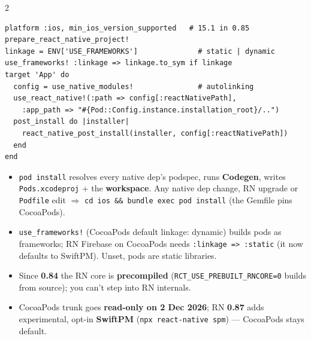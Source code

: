 \documentclass[8pt]{extarticle}
\newcommand\ct[1]{\texttt{#1}}
\newcommand\dd{\hbox{-}\hbox{-}}          %
\newcommand\fat{\hbox{=}\hbox{>}}         %
\newcommand\hd[1]{\par\vspace{3pt}\noindent{\bfseries\color{sheetBlue}#1}\par\vspace{1pt}}
\begin{document}

\begin{multicols}{2}
\raggedright{}

\hd{Podfile and \ct{pod install}}
\begin{lstlisting}[language=RubySheet]
platform :ios, min_ios_version_supported   # 15.1 in 0.85
prepare_react_native_project!
linkage = ENV['USE_FRAMEWORKS']              # static | dynamic
use_frameworks! :linkage => linkage.to_sym if linkage
target 'App' do
  config = use_native_modules!               # autolinking
  use_react_native!(:path => config[:reactNativePath],
    :app_path => "#{Pod::Config.instance.installation_root}/..")
  post_install do |installer|
    react_native_post_install(installer, config[:reactNativePath])
  end
end
\end{lstlisting}
\begin{itemize}
  \item \ct{pod install} resolves every native dep's podspec, runs \textbf{Codegen}, writes
        \ct{Pods.xcodeproj} + the \textbf{workspace}. Any native dep change, RN upgrade or
        \ct{Podfile} edit $\Rightarrow$ \ct{cd ios \&\& bundle exec pod install} (the Gemfile pins
        CocoaPods).
  \item \ct{use\_frameworks!} (CocoaPods default linkage: dynamic) builds pods as frameworks; RN
        Firebase on CocoaPods needs \ct{:linkage \fat{} :static} (it now defaults to SwiftPM).
        Unset, pods are static libraries.
  \item Since \textbf{0.84} the RN core is \textbf{precompiled} (\ct{RCT\_USE\_PREBUILT\_RNCORE=0}
        builds from source); you can't step into RN internals.
  \item CocoaPods trunk goes \textbf{read-only on 2 Dec 2026}; RN \textbf{0.87} adds
        experimental, opt-in \textbf{SwiftPM} (\ct{npx react-native spm}) — CocoaPods stays default.
\end{itemize}


\end{multicols}
\end{document}
